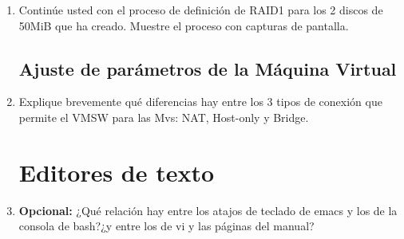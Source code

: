 \documentclass[paper=a4, fontsize=11pt]{scrartcl} %
\numberwithin{equation}{section} %
\numberwithin{figure}{section} %
\numberwithin{table}{section} %
\begin{document}
\begin{enumerate}
		\item Continúe usted con el proceso de definición de RAID1 para los 2 discos de 50MiB que
		ha creado. Muestre el proceso con capturas de pantalla.
		
	\subsection{Ajuste de parámetros de la Máquina Virtual}
		\item Explique brevemente qué diferencias hay entre los 3 tipos de conexión que permite el
		VMSW para las Mvs: NAT, Host-only y Bridge.
		
	\section{Editores de texto}
		\item \textbf{Opcional:} ¿Qué relación hay entre los atajos de teclado de emacs y los de
		la consola de bash?¿y entre los de vi y las páginas del manual?
		
\end{enumerate}


\newpage
\end{document}
